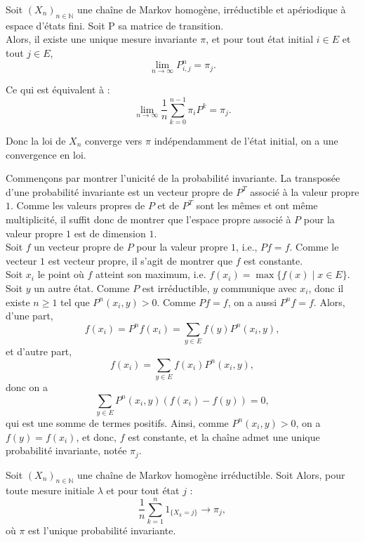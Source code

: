 \documentclass{article}
\begin{document}
\begin{tcolorbox}[colback=white,colframe=red!80!black,title=Théorème de convergence]
Soit $(X_n)_{n \in \mathbb{N}}$ une chaîne de Markov homogène, irréductible et apériodique à espace d'états fini. Soit P sa matrice de transition.\\
Alors, il existe une unique mesure invariante $\pi$, et pour tout état initial $i \in E$ et tout $j \in E$,
\[
\lim_{n \to \infty} P^n_{i,j} = \pi_j.
\]

Ce qui est équivalent à :
\[
\lim_{n \to \infty} \frac{1}{n} \sum_{k=0}^{n-1} \pi_i P^k = \pi_j.
\]

Donc la loi de $X_n$ converge vers $\pi$ indépendamment de l'état initial, on a une convergence en loi.
\end{tcolorbox}

\begin{tcolorbox}[colback=white, colframe=green!80!black, title=Démonstration, breakable]
Commençons par montrer l'unicité de la probabilité invariante.
La transposée d'une probabilité invariante est un vecteur propre de $P^T$ associé à la valeur propre $1$.
Comme les valeurs propres de $P$ et de $P^T$ sont les mêmes et ont même multiplicité, il suffit donc de montrer que l'espace propre associé à $P$ pour la valeur propre $1$ est de dimension $1$. \\
Soit $f$ un vecteur propre de $P$ pour la valeur propre $1$, i.e., $Pf = f$. Comme le vecteur $1$ est vecteur propre, il s'agit de montrer que $f$ est constante. \\

Soit $x_i$ le point où $f$ atteint son maximum, i.e. $f(x_i) = \max\{f(x) \mid x \in E\}$. Soit $y$ un autre état. Comme $P$ est irréductible, $y$ communique avec $x_i$, donc il existe $n \geq 1$ tel que $P^n(x_i, y) > 0$. Comme $Pf = f$, on a aussi $P^n f = f$. Alors, d'une part,
\[
f(x_i) = P^n f(x_i) = \sum_{y \in E} f(y) P^n(x_i, y),
\]
et d'autre part,
\[
f(x_i) = \sum_{y \in E} f(x_i) P^n(x_i, y),
\]
donc on a
\[
\sum_{y \in E} P^n(x_i, y) \left(f(x_i) - f(y)\right) = 0,
\]
qui est une somme de termes positifs. Ainsi, comme $P^n(x_i, y) > 0$, on a $f(y) = f(x_i)$, et donc, $f$ est constante, et la chaîne admet une unique probabilité invariante, notée $\pi_j$.
\end{tcolorbox}

\begin{tcolorbox}[colback=white,colframe=red!80!black,title=Valeur de convergence]
Soit $(X_n)_{n \in \mathbb{N}}$ une chaîne de Markov homogène irréductible. Soit Alors, pour toute mesure initiale $\lambda$ et pour tout état $j$ :
\[
\frac{1}{n} \sum_{k=1}^{n} 1_{\{X_k = j\}} \rightarrow \pi_j,
\]
où $\pi$ est l'unique probabilité invariante.
\end{tcolorbox}
\end{document}
